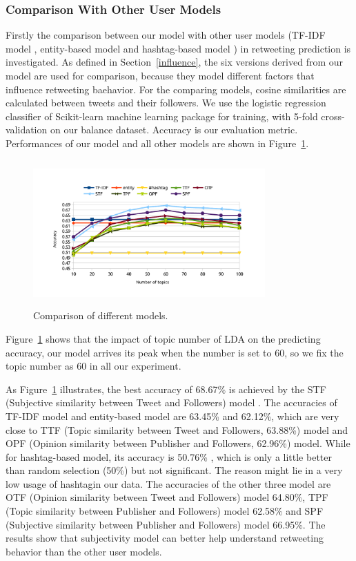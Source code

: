\documentclass[smallcondensed]{svjour3}     %
\begin{document}
\subsubsection{Comparison With Other User Models}
\label{comparison}
Firstly the comparison between our model with other user models (TF-IDF model \cite{Luo:2013RMF}, entity-based model and hashtag-based model \cite{Abel:2011AUM}) in retweeting prediction is investigated.
As defined in Section~\ref{influence}, the six versions derived from our model are used for comparison, because they model different factors that influence retweeting baehavior.
For the comparing models, cosine similarities are calculated between tweets and their followers.
We use the logistic regression classifier of Scikit-learn machine learning package \cite{scikit-learn} for training, with 5-fold cross-validation on our balance dataset. Accuracy is our evaluation metric.
Performances of our model and all other models are shown in Figure~\ref{fig:graph7}.
\begin{figure}[htb]
\centering
\includegraphics[width=3.5in,height=2.2in]{comparison.pdf}
\caption{Comparison of different models.}
\label{fig:graph7}
\end{figure}
Figure~\ref{fig:graph7} shows that the impact of topic number of LDA on the predicting accuracy, our model arrives its peak when the number is set to 60, so we fix the topic number as 60 in all our experiment.

As Figure~\ref{fig:graph7} illustrates, the best accuracy of 68.67\% is achieved by the STF (Subjective similarity between Tweet and Followers) model .
The accuracies of TF-IDF model and entity-based model are 63.45\% and 62.12\%, which are very close to TTF (Topic similarity between Tweet and Followers, 63.88\%) model and OPF (Opinion similarity between Publisher and Followers, 62.96\%) model.
While for hashtag-based model, its accuracy is  50.76\% , which is only a little better than random selection (50\%) but not significant. The reason might lie in a very low usage of hashtagin our data. 
The accuracies of the other three model are OTF (Opinion similarity between Tweet and Followers) model 64.80\%, TPF (Topic similarity between Publisher and Followers) model 62.58\% and SPF (Subjective similarity between Publisher and Followers) model 66.95\%.
The results show that subjectivity model  can better help understand retweeting behavior than the other user models.
\end{document}
